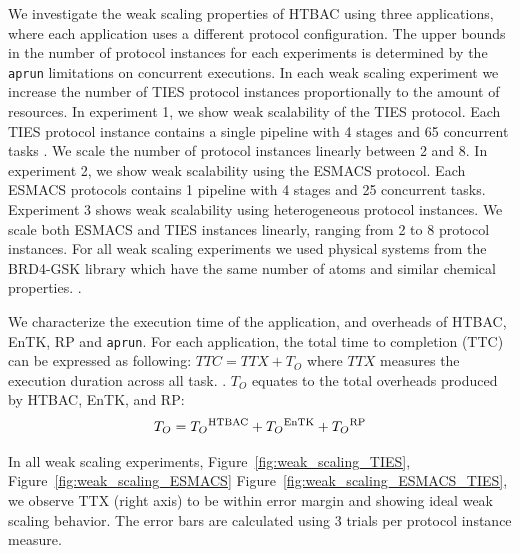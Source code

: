 We investigate the weak scaling properties of HTBAC using three applications,
where each application uses a different protocol configuration. The upper bounds
in the number of protocol instances for each experiments is determined by 
the \texttt{aprun} limitations on concurrent executions. In each weak scaling 
experiment we increase the number of TIES protocol instances proportionally to 
the amount of resources. In experiment 1, we show weak scalability of the TIES 
protocol. Each TIES protocol instance contains a single pipeline with 4 stages 
and 65 concurrent tasks
 . We scale the number of protocol instances linearly 
between 2 and 8. In experiment 2, we show weak scalability using the ESMACS 
protocol. Each ESMACS protocols contains 1 pipeline with 4 stages and 25 
concurrent tasks. Experiment 3 shows weak scalability using heterogeneous 
protocol instances. We scale both ESMACS and TIES instances linearly, ranging 
from 2 to 8 protocol instances. For all weak scaling experiments we used 
physical systems from the BRD4-GSK library which have the same number of atoms
and similar chemical properties. .

We characterize the execution time of the application, and overheads of HTBAC, 
EnTK, RP and \texttt{aprun}.  For each application, the total time to completion 
(TTC)   can 
be expressed as following: $TTC = TTX + T_{O}$ where \(TTX\) measures the 
execution duration across all task.
. 
$T_{O}$ equates to the total overheads produced by HTBAC, EnTK, and 
RP: $$T_{O} = 
T_{O}\textsuperscript{HTBAC} + T_{O}\textsuperscript{EnTK} + 
T_{O}\textsuperscript{RP}$$ 



In all weak scaling experiments, Figure~\ref{fig:weak_scaling_TIES}, 
Figure~\ref{fig:weak_scaling_ESMACS} Figure~\ref{fig:weak_scaling_ESMACS_TIES},
we observe TTX (right axis) to be within error margin and showing ideal weak 
scaling behavior. The error bars are calculated using 3 trials per protocol 
instance measure. 


